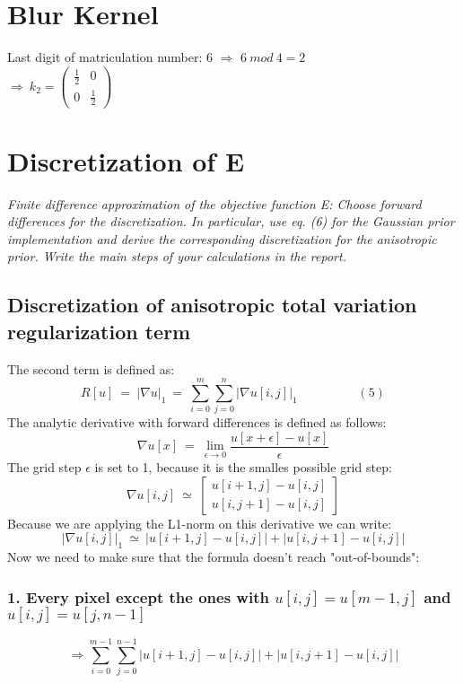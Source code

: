 \documentclass{report}
\begin{document}
	\section*{Blur Kernel}
	\startsection
		Last digit of matriculation number: 6 $\Rightarrow$ $6 \ mod \ 4 = 2$ \\
		$\Rightarrow \ k_2 = \begin{pmatrix} \frac{1}{2} & 0 \\ 0 & \frac{1}{2} \end{pmatrix}$
	\closesection

	\section{Discretization of E}
	\startsection
		\textit{Finite difference approximation of the objective function E: Choose forward differences for the discretization.
In particular, use eq. (6) for the Gaussian prior implementation and derive the corresponding discretization
for the anisotropic prior. Write the main steps of your calculations in the report.}
		\subsection{Discretization of anisotropic total variation regularization term}
		\startsubsection
			The second term is defined as:
			\[ R[u] \ = \ | \nabla u | _1 \ = \ \sum_{i=0}^{m} \sum_{j=0}^{n} | \nabla u[i,j] | _1 \hspace{2cm} (5)\]
			The analytic derivative with forward differences is defined as follows:
			\[ \nabla u[x] \ = \ \lim_{\epsilon \rightarrow 0} \frac{u[x + \epsilon] - u[x]}{\epsilon} \]
			The grid step $\epsilon$ is set to 1, because it is the smalles possible grid step:
			\[ \nabla u[i,j] \ \simeq \ \begin{bmatrix} u[i+1,j] - u[i,j] \\ u[i,j+1] - u[i,j] \end{bmatrix} \]
			Because we are applying the L1-norm on this derivative we can write:
			\[ | \nabla u[i,j] | _1 \ \simeq \ | u[i+1,j] - u[i,j] | + | u[i,j+1] - u[i,j] | \]
			Now we need to make sure that the formula doesn't reach "out-of-bounds":
			\subsubsection{1. Every pixel except the ones with $u[i,j] = u[m-1,j]$ and $u[i,j] = u[j,n-1]$}
			\[
				\Rightarrow \sum_{i=0}^{m-1} \sum_{j=0}^{n-1} | u[i+1,j] - u[i,j] | + | u[i,j+1] - u[i,j] |
			\]
\end{document}
